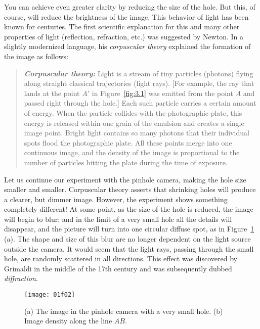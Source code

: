 \documentclass[nochecklpage]{stefan1}
\theoremstyle{definition}
\begin{document}
You can achieve even greater clarity by reducing the size of the hole.
But this, of course, will reduce the brightness of the image. This
behavior of light has been known for centuries. The first scientific
explanation for this and many other properties of light (reflection,
refraction, etc.) was suggested by Newton. In a slightly modernized
language, his \emph{corpuscular theory}
explained the formation of the image as follows:
%
\begin{quote}
\textbf{\textit{Corpuscular theory:}} Light is a stream of tiny particles
(photons) flying along straight classical trajectories (light rays).
[For example, the ray that lands at the point $ A'$ in Figure~\ref{fig:3.1} was emitted from the point $ A $ and passed right through
the hole.] Each such particle carries a certain amount of energy. When
the particle collides with the photographic plate, this energy is
released within one grain of the emulsion and creates a single image
point. Bright light contains so many photons that their individual spots
flood the photographic plate. All these points
merge into one continuous image, and the density of the image is
proportional to the number of particles hitting the plate during the
time of exposure.
\end{quote}
%
Let us continue our experiment with the pinhole camera, making the hole
size smaller and smaller. Corpuscular theory asserts that shrinking
holes will produce a clearer, but dimmer image. However, the experiment
shows something completely different! At some point, as the size of the
hole is reduced, the image will begin to blur; and in the limit of a
very small hole all the details will disappear, and the picture will
turn into one circular diffuse spot, as in Figure~\ref{fig:3.2}\,(a). The
shape and size of this blur are no longer dependent on the light source
outside the camera. It would seem that the light rays, passing through
the small hole, are randomly scattered in all directions. This effect
was discovered by Grimaldi in the middle of the 17th century and was
subsequently dubbed \emph{diffraction}.

\begin{figure}[h]
\vspace*{-6pt}
\texttt{[image: 01f02]}
\caption{(a) The image in the pinhole camera with a very small hole. (b) Image
density along the line $AB$.}
\label{fig:3.2}
\vspace*{-6pt}
\end{figure}
\end{document}
